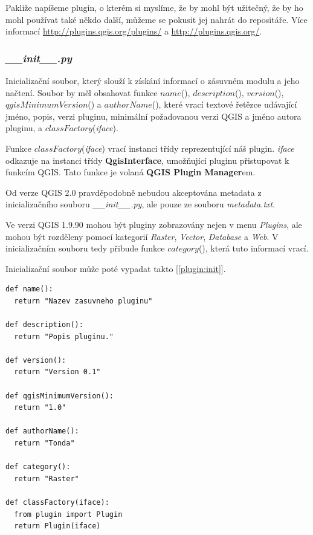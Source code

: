 Pakliže napíšeme plugin, o kterém si myslíme, že by mohl být užitečný,
že by ho mohl používat také někdo další, můžeme se pokusit jej nahrát
do repositáře. Více informací \url{http://plugins.qgis.org/plugins/}
a \url{http://plugins.qgis.org/}.

\subsubsection*{\textit{\_\_init\_\_.py}}
Inicializační soubor, který slouží k získání informací o zásuvném
modulu a jeho načtení. Soubor by měl obsahovat funkce $name$(),
$description$(), $version$(),\newline $qgisMinimumVersion$() a
$authorName$(), které vrací textové řetězce udávající jméno, popis,
verzi pluginu, minimální požadovanou verzi QGIS a jméno autora
pluginu, a $classFactory$(\textit{iface}).

Funkce $classFactory$(\textit{iface}) vrací instanci třídy
reprezentující náš plugin. \textit{iface} odkazuje na instanci
třídy \textbf{QgisInterface}, umožňující pluginu přistupovat k funkcím
QGIS. Tato funkce je volaná \textbf{QGIS Plugin Manager}em.

Od verze QGIS 2.0 pravděpodobně nebudou akceptována metadata z
inicializačního souboru \textit{\_\_init\_\_.py}, ale pouze ze
souboru \textit{metadata.txt}.

Ve verzi QGIS 1.9.90 mohou být pluginy zobrazovány nejen v
menu \textit{Plugins}, ale mohou být rozděleny pomocí
kategorií \textit{Raster}, \textit{Vector}, \textit{Database}
a \textit{Web}. V inicializačním souboru tedy přibude funkce
$category$(), která tuto informací vrací.

Inicializační soubor může poté vypadat takto
[\autoref{plugin:init}]. \\

\begin{lstlisting}[caption={\_\_init\_\_.py - inicializační soubor},label=plugin:init]
def name():
  return "Nazev zasuvneho pluginu"

def description():
  return "Popis pluginu."

def version():
  return "Version 0.1"

def qgisMinimumVersion():
  return "1.0"

def authorName():
  return "Tonda"

def category():
  return "Raster"

def classFactory(iface):
  from plugin import Plugin
  return Plugin(iface)
\end{lstlisting}

